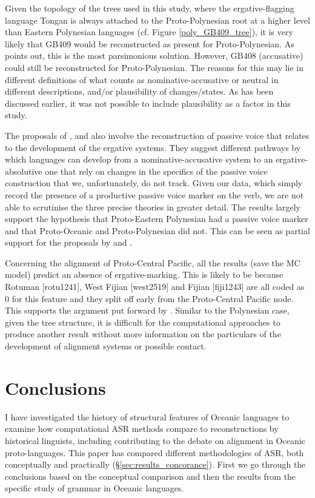 \documentclass[12pt,letterpaper]{article}
\begin{document}
Given the topology of the trees used in this study, where the ergative-flagging language Tongan is always attached to the Proto-Polynesian root at a higher level than Eastern Polynesian languages (cf. Figure \ref{poly_GB409_tree}), it is very likely that GB409 would be reconstructed as present for Proto-Polynesian. As \citeauthor{clark1973aspects} points out, this is the most parsimonious solution. However, GB408 (accusative) could still be reconstructed for Proto-Polynesian. The reasons for this may lie in different definitions of what counts as nominative-accusative or neutral in different descriptions, and/or plausibility of changes/states. As has been discussed earlier, it was not possible to include plausibility as a factor in this study.

The proposals of \citet{hale_1968}, \citet{hohepa_1967, hohepa_1969} and \citet{chung1978} also involve the reconstruction of passive voice that relates to the development of the ergative systems. They suggest different pathways by which languages can develop from a nominative-accusative system to an ergative-absolutive one that rely on changes in the specifics of the passive voice construction that we, unfortunately, do not track. Given our data, which simply record the presence of a productive passive voice marker on the verb, we are not able to scrutinise the three precise theories in greater detail. The results largely support the hypothesis that Proto-Eastern Polynesian had a passive voice marker and that Proto-Oceanic and Proto-Polynesian did not. This can be seen as partial support for the proposals by \citet{hale_1968, hohepa_1967, hohepa_1969} and \citet{chung1978}.

Concerning the alignment of Proto-Central Pacific, all the results (save the MC model) predict an absence of ergative-marking. This is likely to be because Rotuman [rotu1241], West Fijian [west2519] and Fijian [fiji1243] are all coded as 0 for this feature and they split off early from the Proto-Central Pacific node. This supports the argument put forward by \citet{ball2007ergativity}. Similar to the Polynesian case, given the tree structure, it is difficult for the computational approaches to produce another result without more information on the particulars of the development of alignment systems or possible contact.

\FloatBarrier
\section{Conclusions}
\label{conclusions}
I have investigated the history of structural features of Oceanic languages to examine how computational ASR methods compare to reconstructions by historical linguists, including contributing to the debate on alignment in Oceanic proto-languages. This paper has compared different methodologies of ASR, both conceptually and practically (§\ref{sec:results_concorance}). First we go through the conclusions based on the conceptual comparison and then the results from the specific study of grammar in Oceanic languages.
\end{document}
